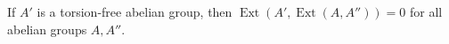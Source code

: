 If $A'$ is a torsion-free abelian group, then $\operatorname{Ext}(A', \operatorname{Ext}(A, A'')) = 0$ for all abelian groups $A, A''$.

